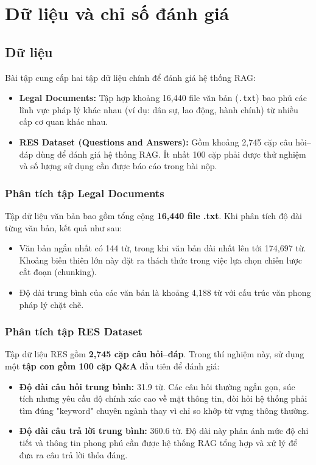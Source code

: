 \section{Dữ liệu và chỉ số đánh giá}

\subsection{Dữ liệu}

Bài tập cung cấp hai tập dữ liệu chính để đánh giá hệ thống RAG:

\begin{itemize}
  \item \textbf{Legal Documents:} Tập hợp khoảng 16,440 file văn bản (\texttt{.txt}) bao phủ các lĩnh vực pháp lý khác nhau (ví dụ: dân sự, lao động, hành chính) từ nhiều cấp cơ quan khác nhau.

  \item \textbf{RES Dataset (Questions and Answers):} Gồm khoảng 2,745 cặp câu hỏi--đáp dùng để đánh giá hệ thống RAG. Ít nhất 100 cặp phải được thử nghiệm và số lượng sử dụng cần được báo cáo trong bài nộp.
\end{itemize}

\subsubsection{Phân tích tập Legal Documents}

Tập dữ liệu văn bản bao gồm tổng cộng \textbf{16,440 file .txt}. Khi phân tích độ dài từng văn bản, kết quả như sau:

\begin{itemize}
  \item Văn bản ngắn nhất có 144 từ, trong khi văn bản dài nhất lên tới 174,697 từ. Khoảng biến thiên lớn này đặt ra thách thức trong việc lựa chọn chiến lược cắt đoạn (chunking).
  \item Độ dài trung bình của các văn bản là khoảng 4,188 từ với cấu trúc văn phong pháp lý chặt chẽ.
\end{itemize}

\subsubsection{Phân tích tập RES Dataset}

Tập dữ liệu RES gồm \textbf{2,745 cặp câu hỏi--đáp}. Trong thí nghiệm này, sử dụng một \textbf{tập con gồm 100 cặp Q\&A} đầu tiên để đánh giá:

\begin{itemize}
  \item \textbf{Độ dài câu hỏi trung bình:} 31.9 từ. Các câu hỏi thường ngắn gọn, súc tích nhưng yêu cầu
độ chính xác cao về mặt thông tin, đòi hỏi hệ thống phải tìm đúng "keyword" chuyên
ngành thay vì chỉ so khớp từ vựng thông thường.
  \item \textbf{Độ dài câu trả lời trung bình:} 360.6 từ. Độ dài này phản ánh mức độ chi tiết và thông tin
phong phú cần được hệ thống RAG tổng hợp và xử lý để đưa ra câu trả lời thỏa đáng.
\end{itemize}

